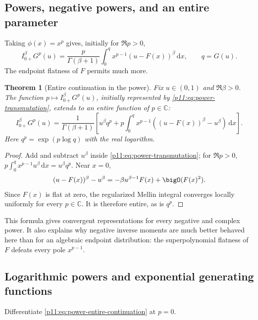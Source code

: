 \documentclass[11pt,oneside]{article}
\newtheorem{theorem}{Theorem}[section]
\theoremstyle{definition}
\theoremstyle{remark}
\newcommand{\C}{\mathbb C}
\newcommand{\dd}{\,\mathrm d}
\newcommand{\1}{\mathbf 1}
\begin{document}
\subsection{Powers, negative powers, and an entire parameter}

Taking $\phi(x)=x^p$ gives, initially for $\Re p>0$,
\begin{equation}
 I_{0+}^{\beta}G^p(u)
 =\frac{p}{\Gamma(\beta+1)}
  \int_0^{q}x^{p-1}(u-F(x))^\beta\dd x,
 \qquad q=G(u).
 \label{p11:eq:power-transmutation}
\end{equation}
The endpoint flatness of $F$ permits much more.

\begin{theorem}[Entire continuation in the power]
\label{p11:thm:entire-p}
Fix $u\in(0,1)$ and $\Re\beta>0$.  The function
$p\mapsto I_{0+}^{\beta}G^p(u)$, initially represented by
\eqref{p11:eq:power-transmutation}, extends to an entire function of $p\in\C$:
\begin{equation}
 I_{0+}^{\beta}G^p(u)
 =\frac{1}{\Gamma(\beta+1)}\left[
 u^\beta q^p
 +p\int_0^q x^{p-1}
   \left((u-F(x))^\beta-u^\beta\right)\dd x
 \right].
 \label{p11:eq:power-entire-continuation}
\end{equation}
Here $q^p=\exp(p\log q)$ with the real logarithm.
\end{theorem}

\begin{proof}
Add and subtract $u^\beta$ inside \eqref{p11:eq:power-transmutation}; for
$\Re p>0$,
$p\int_0^q x^{p-1}u^\beta\dd x=u^\beta q^p$.  Near $x=0$,
\begin{equation}
 (u-F(x))^\beta-u^\beta
 =-\beta u^{\beta-1}F(x)+\bigO(F(x)^2).
\end{equation}
Since $F(x)$ is flat at zero, the regularized Mellin integral converges
locally uniformly for every $p\in\C$.  It is therefore entire, as is $q^p$.
\end{proof}

This formula gives convergent representations for every negative and complex
power.  It also explains why negative inverse moments are much better
behaved here than for an algebraic endpoint distribution: the superpolynomial
flatness of $F$ defeats every pole $x^{p-1}$.

\subsection{Logarithmic powers and exponential generating functions}

Differentiate \eqref{p11:eq:power-entire-continuation} at $p=0$.
\end{document}

